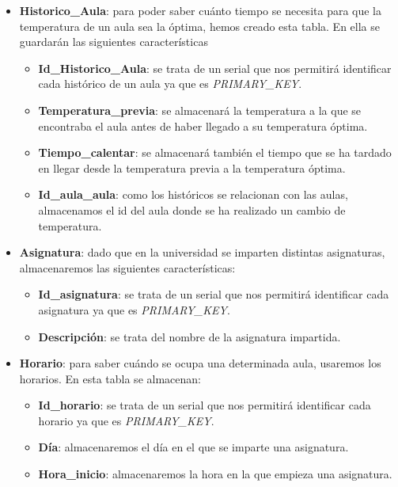 \documentclass[12pt]{report}
\begin{document}
\begin{itemize}
\begin{itemize}
        \\
    \end{itemize} 
    \item  \textbf{Historico\_Aula}: para poder saber cuánto tiempo se necesita para que la temperatura de un aula sea la óptima, hemos creado esta tabla. En ella se guardarán las siguientes características
    \begin{itemize}
        \item\textbf{Id\_Historico\_Aula}: se trata de un serial que nos permitirá identificar cada histórico de un aula ya que es \textit{PRIMARY\_KEY}.
        \item \textbf{Temperatura\_previa}: se almacenará la temperatura a la que se encontraba el aula antes de haber llegado a su temperatura óptima.
        \item \textbf{Tiempo\_calentar}: se almacenará también el tiempo que se ha tardado en llegar desde la temperatura previa a la temperatura óptima.
        \item \textbf{Id\_aula\_aula}: como los históricos se relacionan con las aulas, almacenamos el id del aula donde se ha realizado un cambio de temperatura.
        \\
    \end{itemize} 
    \item  \textbf{Asignatura}: dado que en la universidad se imparten distintas asignaturas, almacenaremos las siguientes características:
    \begin{itemize}
        \item\textbf{Id\_asignatura}: se trata de un serial que nos permitirá identificar cada asignatura ya que es \textit{PRIMARY\_KEY}.
        \item \textbf{Descripción}: se trata del nombre de la asignatura impartida.
        \\
    \end{itemize} 
    \item  \textbf{Horario}: para saber cuándo se ocupa una determinada aula, usaremos los horarios. En esta tabla se almacenan:
    \begin{itemize}
        \item\textbf{Id\_horario}: se trata de un serial que nos permitirá identificar cada horario ya que es \textit{PRIMARY\_KEY}.
        \item \textbf{Día}: almacenaremos el día en el que se imparte una asignatura.
        \item \textbf{Hora\_inicio}: almacenaremos la hora en la que empieza una asignatura.

\end{itemize}
\end{itemize}
\end{document}
